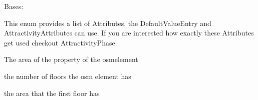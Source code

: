 \documentclass[letterpaper,10pt,english]{sphinxmanual}
\begin{document}
\begin{fulllineitems}
\label{\detokenize{apidoc/src.osm_configurator.model.project.configuration:src.osm_configurator.model.project.configuration.attribute_enum.Attribute}}
\pysigstartsignatures
{}
\pysigstopsignatures
\sphinxAtStartPar
Bases: 

\sphinxAtStartPar
This enum provides a list of Attributes, the DefaultValueEntry and AttractivityAttributes can use.
If you are interested how exactly these Attributes get used checkout AttractivityPhase.

\begin{fulllineitems}
\label{\detokenize{apidoc/src.osm_configurator.model.project.configuration:src.osm_configurator.model.project.configuration.attribute_enum.Attribute.PROPERTY_AREA}}
\pysigstartsignatures
{}
\pysigstopsignatures
\sphinxAtStartPar
The area of the property of the osm\sphinxhyphen{}element

\end{fulllineitems}


\begin{fulllineitems}
\label{\detokenize{apidoc/src.osm_configurator.model.project.configuration:src.osm_configurator.model.project.configuration.attribute_enum.Attribute.NUMER_OF_FLOOR}}
\pysigstartsignatures
{}
\pysigstopsignatures
\sphinxAtStartPar
the number of floors the osm element has

\end{fulllineitems}


\begin{fulllineitems}
\label{\detokenize{apidoc/src.osm_configurator.model.project.configuration:src.osm_configurator.model.project.configuration.attribute_enum.Attribute.FIRST_FLOOR_AREA}}
\pysigstartsignatures
{}
\pysigstopsignatures
\sphinxAtStartPar
the area that the first floor has


\end{fulllineitems}
\end{fulllineitems}
\end{document}
